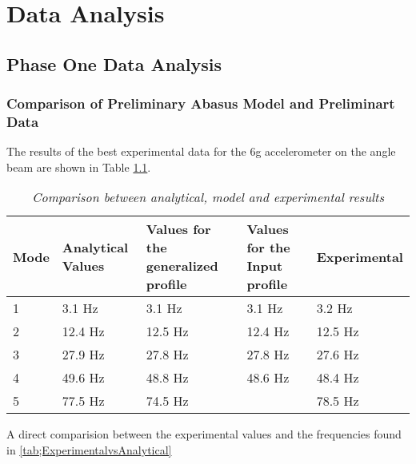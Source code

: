 \chapter{Data Analysis}

\section{Phase One Data Analysis}

\subsection{Comparison of Preliminary Abasus Model and Preliminart Data }

\indent The results of the best experimental data for the 6g accelerometer on the angle beam are shown in Table \ref{tab:Results_Comp}.\\
\begin{table}
\begin{center}
    \begin{tabular}{|l| p{3.5cm}| p{3cm}| p{3cm}| p{3cm}|}
    \hline
    \textbf{Mode} & \textbf{Analytical Values} & \textbf{Values for the generalized profile} & \textbf{Values for the Input profile} & \textbf{Experimental} \\\hline
    1    & 3.1 Hz            & 3.1 Hz                             & 3.1 Hz                       & 3.2 Hz       \\\hline
    2    & 12.4 Hz           & 12.5 Hz                            & 12.4 Hz                      & 12.5 Hz      \\\hline
    3    & 27.9 Hz           & 27.8 Hz                            & 27.8 Hz                      & 27.6 Hz      \\\hline
    4    & 49.6 Hz           & 48.8 Hz                            & 48.6 Hz                      & 48.4 Hz      \\\hline
    5    & 77.5 Hz           & 74.5 Hz                            &                             & 78.5 Hz      \\\hline
    \end{tabular}
    \caption{\textit{Comparison between analytical, model and experimental results}}
    \label{tab:Results_Comp}
\end{center}
\end{table}

A direct comparision between the experimental values and the frequencies found in \ref{tab;ExperimentalvsAnalytical}\\


